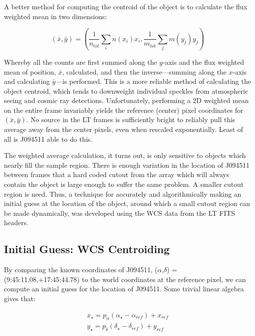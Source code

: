 \documentclass[a4paper,11pt]{article}
\begin{document}
A better method for computing the centroid of the object is to calculate the flux weighted mean in two dimensions:

\begin{equation}
        (\bar{x},\bar{y}) =
        \left( \frac{1}{n_{tot}} \sum_{i}^{} n(x_i) x_i,
        \frac{1}{m_{tot}} \sum_{j}^{} m(y_j) y_j \right)
\end{equation}

\noindent Whereby all the counts are first summed along the $y$-axis and the flux weighted mean of position, $\bar{x}$, calculated, and then the inverse---summing along the $x$-axis and calculating $\bar{y}$---is performed. This is a more reliable method of calculating the object centroid, which tends to downweight individual speckles from atmospheric seeing and cosmic ray detections. Unfortunately, performing a 2D weighted mean on the entire frame invariably yields the reference (center) pixel coordinates for $(\bar{x},\bar{y})$. No source in the LT frames is sufficiently bright to reliably pull this average away from the center pixels, even when rescaled exponentially. Least of all is J094511 able to do this.

The weighted average calculation, it turns out, is only sensitive to objects which nearly fill the sample region. There is enough variation in the location of J094511 between frames that a hard coded cutout from the array which will always contain the object is large enough to suffer the same problem. A smaller cutout region is need. Thus, a technique for accurately and algorithmically making an initial guess at the location of the object, around which a small cutout region can be made dynamically, was developed using the WCS data from the LT FITS headers.

\subsection{Initial Guess: WCS Centroiding}\label{sec:wcs_centroid}

By comparing the known coordinates of J094511, ($\alpha$,$ \delta$) = (9:45:11.08,+17:45:44.78) to the world coordinates at the reference pixel, we can compute an initial guess for the location of J094511. Some trivial linear algebra gives that:

\begin{align}
    x_\star = p_\alpha(\alpha_\star - \alpha_{ref}) + x_{ref} \\
    y_\star = p_\delta(\delta_\star - \delta_{ref}) + y_{ref}
    \label{eq:wcs_linalg}
\end{align}
\end{document}
